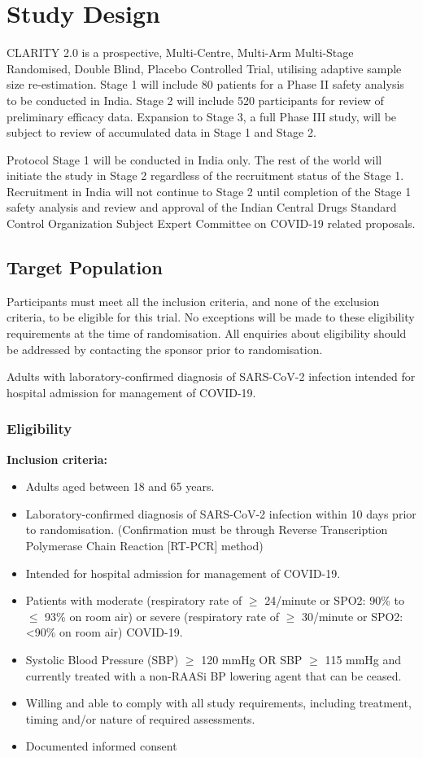 \documentclass[11pt,parskip=half-]{scrartcl}
\begin{document}
\clearpage

\section{Study Design}
CLARITY 2.0 is a prospective, Multi-Centre, Multi-Arm Multi-Stage Randomised, Double Blind, Placebo Controlled Trial, utilising adaptive sample size re-estimation. Stage 1 will include 80 patients for a Phase II safety analysis to be conducted in India. Stage 2 will include 520 participants for review of preliminary efficacy data. Expansion to Stage 3, a full Phase III study, will be subject to review of accumulated data in Stage 1 and Stage 2.

Protocol Stage 1 will be conducted in India only. The rest of the world will initiate the study in Stage 2 regardless of the recruitment status of the Stage 1. Recruitment in India will not continue to Stage 2 until completion of the Stage 1 safety analysis and review and approval of the Indian Central Drugs Standard Control Organization Subject Expert Committee on COVID-19 related proposals.


\subsection{Target Population}
Participants must meet all the inclusion criteria, and none of the exclusion criteria, to be eligible for this trial. No exceptions will be made to these eligibility requirements at the time of randomisation. All enquiries about eligibility should be addressed by contacting the sponsor prior to randomisation.

Adults with laboratory-confirmed diagnosis of SARS-CoV-2 infection intended for hospital admission for management of COVID-19.

\subsubsection{Eligibility}
\textbf{Inclusion criteria:}
\begin{itemize}
    \item Adults aged between 18 and 65 years.
    \item Laboratory-confirmed diagnosis of SARS-CoV-2 infection within 10 days prior to randomisation. (Confirmation must be through Reverse Transcription Polymerase Chain Reaction [RT-PCR] method)
    \item Intended for hospital admission for management of COVID-19.
    \item  Patients with moderate (respiratory rate of $\geq$ 24/minute or SPO2: 90\% to $\leq$ 93\% on room air) or severe (respiratory rate of $\geq$ 30/minute or SPO2: <90\% on room air) COVID-19.
    \item  Systolic Blood Pressure (SBP) $\geq$ 120 mmHg OR SBP $\geq$ 115 mmHg and currently treated with a non-RAASi BP lowering agent that can be ceased.
    \item Willing and able to comply with all study requirements, including treatment, timing and/or nature of required assessments.
    \item Documented informed consent
\end{itemize}
\end{document}
